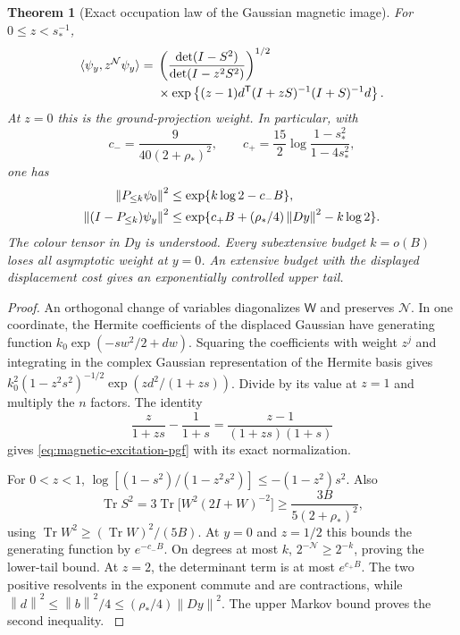 \documentclass[11pt,oneside,openany]{book}
\newtheorem{theorem}{Theorem}[chapter]
\theoremstyle{definition}
\theoremstyle{remark}
\newcommand{\Tr}{\operatorname{Tr}}
\newcommand{\norm}[1]{\left\lVert#1\right\rVert}
\newcommand{\src}[2]{\cite[#2]{#1}}
\begin{document}
\begin{theorem}[Exact occupation law of the Gaussian magnetic image]
\label{thm:magnetic-excitation-law}
For $0\le z<s_*^{-1}$,
\begin{align}
 \langle\psi_y,z^{\mathcal N}\psi_y\rangle
  ={}&\left(\frac{\det(I-S^2)}{\det(I-z^2S^2)}\right)^{1/2}\notag\\
 &\times\exp\left\{(z-1)d^{\mathsf T}
           (I+zS)^{-1}(I+S)^{-1}d\right\}.
 \label{eq:magnetic-excitation-pgf}
\end{align}
At $z=0$ this is the ground-projection weight. In particular, with
\[
 c_-=\frac{9}{40(2+\rho_*)^2},\qquad
 c_+=\frac{15}{2}\log\frac{1-s_*^2}{1-4s_*^2},
\]
one has
\begin{align}
 \norm{P_{\le k}\psi_0}^2
       &\le\exp\{k\log2-c_-B\},\notag\\
 \norm{(I-P_{\le k})\psi_y}^2
       &\le\exp\{c_+B+(\rho_*/4)\norm{Dy}^2-k\log2\}.
 \label{eq:magnetic-excitation-tails}
\end{align}
The colour tensor in $Dy$ is understood. Every subextensive budget
$k=o(B)$ loses all asymptotic weight at $y=0$. An extensive budget
with the displayed displacement cost gives an exponentially controlled
upper tail.
\end{theorem}
\begin{proof}
An orthogonal change of variables diagonalizes $\mathsf W$ and
preserves $\mathcal N$. In one coordinate, the Hermite coefficients
of the displaced Gaussian have generating function
$k_0\exp(-sw^2/2+dw)$. Squaring the coefficients with weight $z^j$
and integrating in the complex Gaussian representation of the
Hermite basis gives
$k_0^2(1-z^2s^2)^{-1/2}\exp(zd^2/(1+zs))$. Divide by its
value at $z=1$ and multiply the $n$ factors. The identity
\[
 \frac{z}{1+zs}-\frac{1}{1+s}
       =\frac{z-1}{(1+zs)(1+s)}
\]
gives \cref{eq:magnetic-excitation-pgf} with its exact normalization.

For $0<z<1$,
$\log[(1-s^2)/(1-z^2s^2)]\le-(1-z^2)s^2$. Also
\[
 \Tr S^2=3\Tr\bigl[W^2(2I+W)^{-2}\bigr]
    \ge\frac{3B}{5(2+\rho_*)^2},
\]
using $\Tr W^2\ge(\Tr W)^2/(5B)$. At $y=0$ and $z=1/2$
this bounds the generating function by $e^{-c_-B}$. On degrees
at most $k$, $2^{-\mathcal N}\ge2^{-k}$, proving the lower-tail
bound. At $z=2$, the determinant term is at most $e^{c_+B}$.
The two positive resolvents in the exponent commute and are
contractions, while
$\norm d^2\le\norm b^2/4\le(\rho_*/4)\norm{Dy}^2$.
The upper Markov bound proves the second inequality.
\src{F15}{V100}
\end{proof}
\end{document}
